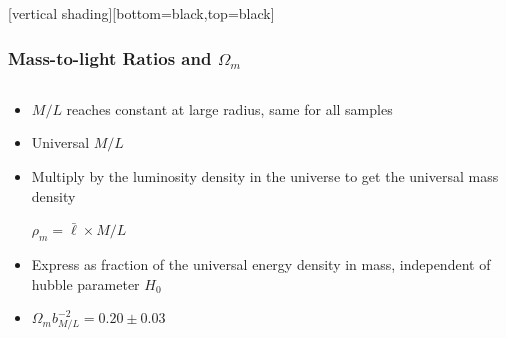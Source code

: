 \documentclass{beamer}
\begin{document}
{
    [vertical shading][bottom=black,top=black]


    \frame
    {
        \frametitle{Mass-to-light Ratios and $\Omega_m$}

        \begin{columns}
            \begin{column}{0.5\textwidth}
                \begin{itemize}
                    \item $M/L$ reaches constant at large radius, same for all samples
                    \item Universal $M/L$

                    \item Multiply by the luminosity density in the universe to
                        get the universal mass density
                        
                        {\color{gold} $\rho_m = \bar{\ell} \times M/L$ }


                    \item Express as fraction of the universal energy density
                        in mass, independent of hubble parameter $H_0$

                    \item {\color{gold} $\Omega_m b_{M/L}^{-2} = 0.20 \pm 0.03$ }


\end{itemize}
\end{column}
\end{columns}}}
\end{document}
